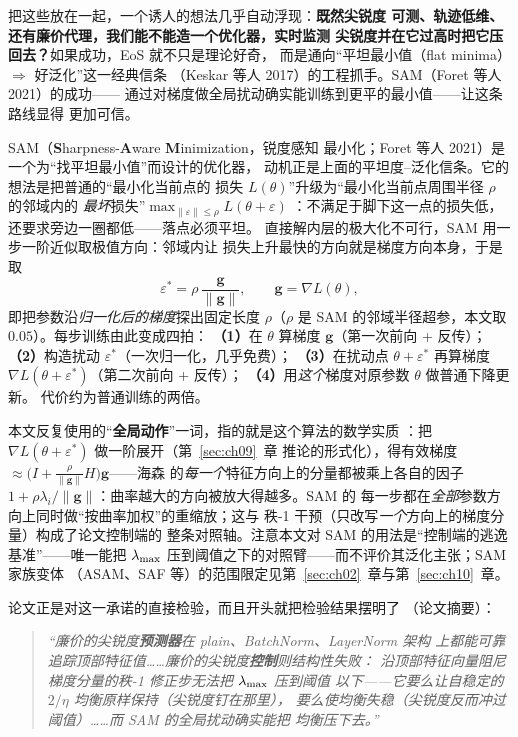 把这些放在一起，一个诱人的想法几乎自动浮现：\textbf{既然尖锐度
可测、轨迹低维、还有廉价代理，我们能不能造一个优化器，实时监测
尖锐度并在它过高时把它压回去？}如果成功，EoS 就不只是理论好奇，
而是通向``平坦最小值（flat minima）$\Rightarrow$ 好泛化''这一经典信条
（Keskar 等人 2017）的工程抓手。SAM（Foret 等人 2021）的成功——
通过对梯度做全局扰动确实能训练到更平的最小值——让这条路线显得
更加可信。

\begin{notebox}[title={概念详解：SAM 是什么}]
SAM（\textbf{S}harpness-\textbf{A}ware \textbf{M}inimization，锐度感知
最小化；Foret 等人 2021）是一个为``找平坦最小值''而设计的优化器，
动机正是上面的平坦度--泛化信条。它的想法是把普通的``最小化当前点的
损失 $L(\theta)$''升级为``最小化当前点周围半径 $\rho$ 的邻域内的
\emph{最坏}损失''$\max_{\|\varepsilon\|\le\rho}L(\theta+\varepsilon)$
：不满足于脚下这一点的损失低，还要求旁边一圈都低——落点必须平坦。
直接解内层的极大化不可行，SAM 用一步一阶近似取极值方向：邻域内让
损失上升最快的方向就是梯度方向本身，于是取
\[
  \varepsilon^{*}=\rho\,\frac{\mathbf{g}}{\|\mathbf{g}\|},
  \qquad \mathbf{g}=\nabla L(\theta),
\]
即把参数沿\emph{归一化后的梯度}探出固定长度 $\rho$（$\rho$ 是 SAM
的邻域半径超参，本文取 $0.05$）。每步训练由此变成四拍：
\textbf{（1）}在 $\theta$ 算梯度 $\mathbf{g}$（第一次前向 + 反传）；
\textbf{（2）}构造扰动 $\varepsilon^{*}$（一次归一化，几乎免费）；
\textbf{（3）}在扰动点 $\theta+\varepsilon^{*}$ 再算梯度
$\nabla L(\theta+\varepsilon^{*})$（第二次前向 + 反传）；
\textbf{（4）}用\emph{这个}梯度对原参数 $\theta$ 做普通下降更新。
代价约为普通训练的两倍。

本文反复使用的``\textbf{全局动作}''一词，指的就是这个算法的数学实质
：把 $\nabla L(\theta+\varepsilon^{*})$ 做一阶展开（第~\ref{sec:ch09}~章
推论的形式化），得有效梯度
$\approx\bigl(I+\tfrac{\rho}{\|\mathbf{g}\|}H\bigr)\mathbf{g}$——海森
的\emph{每一个}特征方向上的分量都被乘上各自的因子
$1+\rho\lambda_i/\|\mathbf{g}\|$：曲率越大的方向被放大得越多。SAM 的
每一步都在\emph{全部}参数方向上同时做``按曲率加权''的重缩放；这与
秩-1 干预（只改写\emph{一个}方向上的梯度分量）构成了论文控制端的
整条对照轴。注意本文对 SAM 的用法是``控制端的逃逸基准''——唯一能把
$\lambda_{\max}$ 压到阈值之下的对照臂——而不评价其泛化主张；SAM 家族变体
（ASAM、SAF 等）的范围限定见第~\ref{sec:ch02}~章与第~\ref{sec:ch10}~章。
\end{notebox}

论文正是对这一承诺的直接检验，而且开头就把检验结果摆明了
（论文摘要）：

\begin{quote}\itshape
``廉价的尖锐度\textbf{预测器}在 plain、BatchNorm、LayerNorm 架构
上都能可靠追踪顶部特征值……廉价的尖锐度\textbf{控制}则结构性失败：
沿顶部特征向量阻尼梯度分量的秩-1 修正步无法把 $\lambda_{\max}$ 压到阈值
以下——它要么让自稳定的 $2/\eta$ 均衡原样保持（尖锐度钉在那里），
要么使均衡失稳（尖锐度反而冲过阈值）……而 SAM 的全局扰动确实能把
均衡压下去。''
\end{quote}

